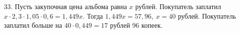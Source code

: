 33. Пусть закупочная цена альбома равна $x$ рублей. Покупатель заплатил $x\cdot2,3\cdot1,05\cdot0,6=1,449x.$ Тогда $1,449x=57,96,\ x=40$ рублей. Покупатель заплатил больше на $40\cdot0,449=17$ рублей 96 копеек.\\
